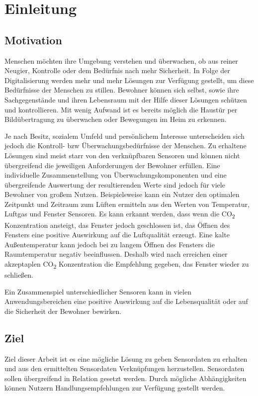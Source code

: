 \chapter{Einleitung}

\section{Motivation}
Menschen möchten ihre Umgebung verstehen und überwachen, ob aus reiner Neugier, Kontrolle oder dem Bedürfnis nach mehr Sicherheit.
In Folge der Digitalisierung werden mehr und mehr Lösungen zur Verfügung gestellt, um diese Bedürfnisse der Menschen zu stillen. Bewohner können sich selbst, sowie ihre Sachgegenstände und ihren Lebensraum mit der Hilfe dieser Lösungen schützen und kontrollieren. Mit wenig Aufwand ist es bereits möglich die Haustür per Bildübertragung zu überwachen oder Bewegungen im Heim zu erkennen.

Je nach Besitz, sozialem Umfeld und persönlichem Interesse unterscheiden sich jedoch die Kontroll- bzw Überwachungsbedürfnisse der Menschen. Zu erhaltene Lösungen sind meist starr von den verknüpfbaren Sensoren und können nicht übergreifend die jeweiligen Anforderungen der Bewohner erfüllen.
Eine individuelle Zusammenstellung von Überwachungskomponenten und eine übergreifende Auswertung der resultierenden Werte sind jedoch für viele Bewohner von großem Nutzen. Beispielsweise kann ein Nutzer den optimalen Zeitpunkt und Zeitraum zum Lüften ermitteln aus den Werten von Temperatur, Luftgas und Fenster Sensoren. Es kann erkannt werden, dass wenn die CO\textsubscript{2} Konzentration ansteigt, das Fenster jedoch geschlossen ist, das Öffnen des Fensters eine positive Auswirkung auf die Luftqualität erzeugt. Eine kalte Außentemperatur kann jedoch bei zu langem Öffnen des Fensters die Raumtemperatur negativ beeinflussen. Deshalb wird nach erreichen einer akzeptaplen CO\textsubscript{2} Konzentration die Empfehlung gegeben, das Fenster wieder zu schließen.

Ein Zusammenspiel unterschiedlicher Sensoren kann in vielen Anwendungsbereichen eine positive Auswirkung auf die Lebensqualität oder auf die Sicherheit der Bewohner bewirken.
\section{Ziel}
Ziel dieser Arbeit ist es eine mögliche Lösung zu geben Sensordaten zu erhalten und aus den ermittelten Sensordaten Verknüpfungen herzustellen. Sensordaten sollen übergreifend in Relation gesetzt werden. Durch mögliche Abhängigkeiten können Nutzern Handlungsempfehlungen zur Verfügung gestellt werden.

